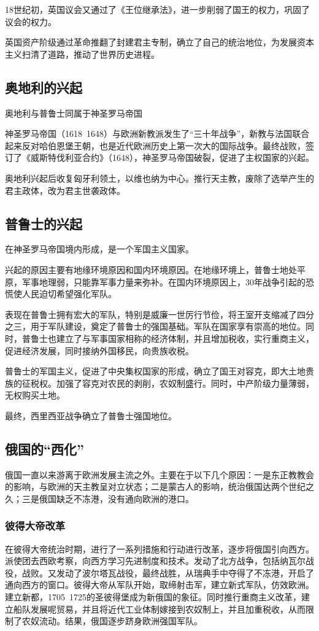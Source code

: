 18世纪初，英国议会又通过了《王位继承法》，进一步削弱了国王的权力，巩固了议会的权力。

英国资产阶级通过革命推翻了封建君主专制，确立了自己的统治地位，为发展资本主义扫清了道路，推动了世界历史进程。

\subsection{奥地利的兴起}
奥地利与普鲁士同属于神圣罗马帝国

神圣罗马帝国（1618~1648）与欧洲新教派发生了“三十年战争”，新教与法国联合起来反对哈伯恩堡王朝，也是近代欧洲历史上第一次大的国际战争。最终战败，签订了《威斯特伐利亚合约》（1648），神圣罗马帝国破裂，促进了主权国家的兴起。

奥地利兴起后收复匈牙利领土，以维也纳为中心。推行天主教，废除了选举产生的君主政体，改为君主世袭政体。

\subsection{普鲁士的兴起}
在神圣罗马帝国境内形成，是一个军国主义国家。

兴起的原因主要有地缘环境原因和国内环境原因。在地缘环境上，普鲁士地处平原，军事地理弱，只能靠军事力量来弥补。在国内环境原因上，30年战争引起的恐慌使人民迫切希望强化军队。

表现在普鲁士拥有宏大的军队，特别是威廉一世厉行节俭，将王室开支缩减了四分之三，用于军队建设，奠定了普鲁士的强国基础。军队在国家享有崇高的地位。同时，普鲁士也建立了与军事国家相称的经济体制，并且增加税收，实行重商主义，促进经济发展，同时接纳外国移民，向贵族收税。

普鲁士的军国主义，促进了中央集权国家的形成，确立了国王对容克，即大土地贵族的征税权。加强了容克对农民的剥削，农奴制盛行。同时，中产阶级力量薄弱，无权购买土地。

最终，西里西亚战争确立了普鲁士强国地位。

\subsection{俄国的“西化”}
俄国一直以来游离于欧洲发展主流之外。主要在于以下几个原因：一是东正教教会的影响，与欧洲的天主教呈对立状态；二是蒙古人的影响，统治俄国达两个世纪之久；三是俄国缺乏不冻港，没有通向欧洲的港口。

\subsubsection{彼得大帝改革}
在彼得大帝统治时期，进行了一系列措施和行动进行改革，逐步将俄国引向西方。派使团去西欧考察，向西方学习先进制度和技术。发动了北方战争，包括纳瓦尔战役，战败。又发动了波尔塔瓦战役，最终战胜，从瑞典手中夺得了不冻港，开启了通向西方的窗口。彼得大帝从军队开始，取缔射击军，建立新式军队，仿效欧洲。建立新都，1705~1725的圣彼得堡成为新俄国的象征。同时推行重商主义改革，建立船队发展呢贸易，并且将近代工业体制嫁接到农奴制上，并且加重税收，从而限制了农奴流动。结果，俄国逐步跻身欧洲强国军队。

